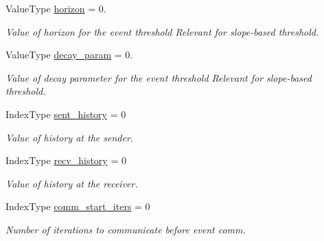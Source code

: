 \begin{DoxyCompactItemize}
Value\+Type \hyperlink{structschwz_1_1Metadata_a9c12719250c5c44ca3096af308d93e4c}{horizon} = 0.
\begin{DoxyCompactList}\small\item\em Value of horizon for the event threshold Relevant for slope-\/based threshold. \end{DoxyCompactList}\item 
\mbox{\label{structschwz_1_1Metadata_aff6fee03271a0615b86d8631d94f505e}} 
Value\+Type \hyperlink{structschwz_1_1Metadata_aff6fee03271a0615b86d8631d94f505e}{decay\+\_\+param} = 0.
\begin{DoxyCompactList}\small\item\em Value of decay parameter for the event threshold Relevant for slope-\/based threshold. \end{DoxyCompactList}\item 
\mbox{\label{structschwz_1_1Metadata_a2b400902089b06b47f230306b51252d5}} 
Index\+Type \hyperlink{structschwz_1_1Metadata_a2b400902089b06b47f230306b51252d5}{sent\+\_\+history} = 0
\begin{DoxyCompactList}\small\item\em Value of history at the sender. \end{DoxyCompactList}\item 
\mbox{\label{structschwz_1_1Metadata_aa03846a987e8d185f1b35ce3a8155422}} 
Index\+Type \hyperlink{structschwz_1_1Metadata_aa03846a987e8d185f1b35ce3a8155422}{recv\+\_\+history} = 0
\begin{DoxyCompactList}\small\item\em Value of history at the receiver. \end{DoxyCompactList}\item 
\mbox{\label{structschwz_1_1Metadata_a716f809953505b19e0f1d9398c167bd4}} 
Index\+Type \hyperlink{structschwz_1_1Metadata_a716f809953505b19e0f1d9398c167bd4}{comm\+\_\+start\+\_\+iters} = 0
\begin{DoxyCompactList}\small\item\em Number of iterations to communicate before event comm. \end{DoxyCompactList}\item 
\mbox{\label{structschwz_1_1Metadata_a50bb2b3dc28c0eabbd423a069e560951}} 

\end{DoxyCompactItemize}
